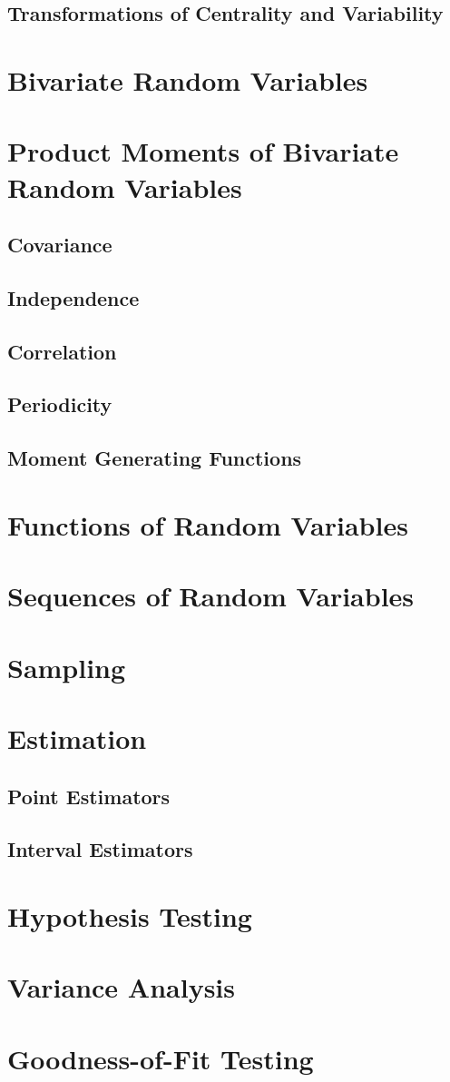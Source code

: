 \documentclass{article}
\begin{document}
\subsection{Transformations of Centrality and Variability}

\section{Bivariate Random Variables}

\section {Product Moments of Bivariate Random Variables}
\subsection{Covariance}
\subsection{Independence}
\subsection{Correlation}
\subsection{Periodicity}
\subsection{Moment Generating Functions}

\section{Functions of Random Variables}

\section{Sequences of Random Variables}

\section{Sampling}

\section{Estimation}

\subsection{Point Estimators}
\subsection{Interval Estimators}

\section{Hypothesis Testing}

\section{Variance Analysis}

\section{Goodness-of-Fit Testing}
\end{document}
